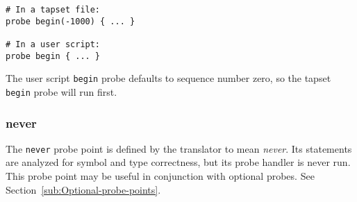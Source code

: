 \documentclass[twoside,english]{article}
\newenvironment{vindent}
{\begin{list}{}{\setlength{\listparindent}{6pt}}
\item[]}
{\end{list}}
\begin{document}
\begin{vindent}
\begin{verbatim}
# In a tapset file:
probe begin(-1000) { ... }

# In a user script:
probe begin { ... }
\end{verbatim}
\end{vindent}
The user script \texttt{begin} probe defaults to sequence number zero, so
the tapset \texttt{begin} probe will run first.


\subsubsection{never}
The \texttt{never} probe point is defined by the translator to mean \emph{never}.
Its statements are analyzed for symbol and type correctness, but its probe
handler is never run. This probe point may be useful in conjunction with
optional probes. See Section~\ref{sub:Optional-probe-points}.


\begin{comment} %
\subsection{Probes to monitor performance}

The perfmon family of probe points is used to access the performance monitoring
hardware available in modern processors. These probe points require perfmon2
support in the kernel to access the hardware.

Performance monitor hardware points have a \texttt{perfmon} prefix. The suffix
names the event being counted, for example \texttt{counter(event)}. The event
names are specific to the processor implementation, except for generic cycle
and instructions events, which are available on all processors. The probe
\texttt{perfmon.counter(event)} starts a counter on the processor which counts
the number of events that occur on that processor. For more details about
the performance monitoring events available on a specific processor, see
the help text returned by typing the perfmon2 command \texttt{pfmon -l.}

\subsubsection{\$counter}

\$counter is a handle used in the body of a probe for operations involving
the counter associated with the probe.

\subsubsection{read\_counter}

read\_counter is a function passed to the handle for a perfmon probe. It
returns the current count for the event.
\end{comment}
\end{document}
